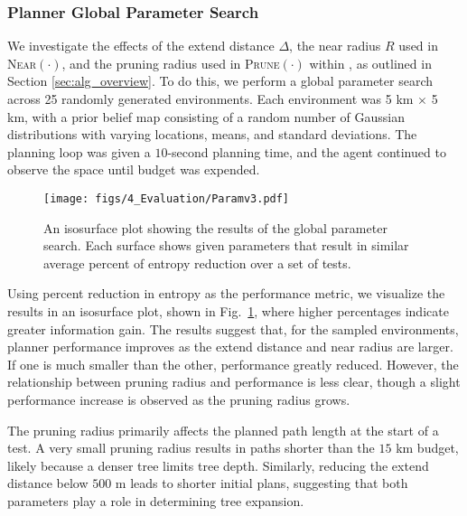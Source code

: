 \subsubsection{Planner Global Parameter Search}
We investigate the effects of the extend distance $\Delta$, the near radius $R$ used in \textsc{Near}$(\cdot)$, and the pruning radius used in \textsc{Prune}$(\cdot)$ within \PlannerName, as outlined in Section \ref{sec:alg_overview}. To do this, we perform a global parameter search across 25 randomly generated environments. Each environment was 5 km $\times$ 5 km, with a prior belief map consisting of a random number of Gaussian distributions with varying locations, means, and standard deviations. The planning loop was given a $10$-second planning time, and the agent continued to observe the space until budget was expended. 


\begin{figure}[t]
\centering
\texttt{[image: figs/4\_Evaluation/Paramv3.pdf]}
\caption{An isosurface plot showing the results of the global parameter search. Each surface shows given parameters that result in similar average percent of entropy reduction over a set of tests.}
\label{fig:param-sweep}
\end{figure}

Using percent reduction in entropy as the performance metric, we visualize the results in an isosurface plot, shown in Fig.~\ref{fig:param-sweep}, where higher percentages indicate greater information gain. 
The results suggest that, for the sampled environments, planner performance improves as the extend distance and near radius are larger. If one is much smaller than the other, performance greatly reduced. However, the relationship between pruning radius and performance is less clear, though a slight performance increase is observed as the pruning radius grows.

The pruning radius primarily affects the planned path length at the start of a test. A very small pruning radius results in paths shorter than the $15$ km budget, likely because a denser tree limits tree depth. Similarly, reducing the extend distance below $500$ m leads to shorter initial plans, suggesting that both parameters play a role in determining tree expansion.

